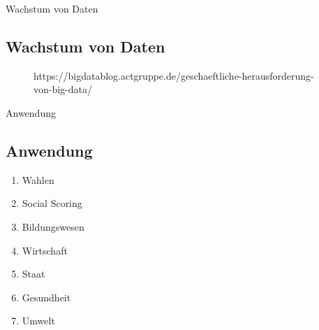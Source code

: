 \documentclass[11pt]{beamer}
\begin{document}
\begin{frame}{Wachstum von Daten}
\subsection{Wachstum von Daten}
	\begin{figure}
		\caption{https://bigdatablog.actgruppe.de/geschaeftliche-herausforderung-von-big-data/}
	\end{figure}
\end{frame}

\begin{frame}{Anwendung}
\subsection{Anwendung}
	\begin{enumerate}
		\item Wahlen 
		\item Social Scoring
		\item Bildungswesen
		\item Wirtschaft
		\item Staat
		\item Gesundheit
		\item Umwelt
	\end{enumerate}
\end{frame}
\end{document}
